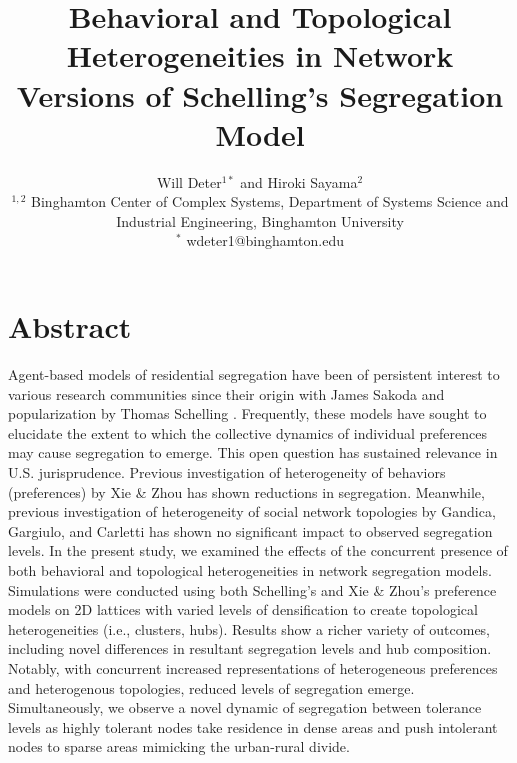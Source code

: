 \documentclass[a4paper]{article}
\date{}
\begin{document}
\title{\bf \large Behavioral and Topological Heterogeneities in Network Versions of Schelling’s Segregation Model}
\author{\normalsize Will Deter$^{1*}$ and Hiroki Sayama$^{2}$\\
\small$^{1,2}$ Binghamton Center of Complex Systems, Department of Systems Science and Industrial Engineering, Binghamton University\\
\small$^*$ wdeter1@binghamton.edu}




\maketitle

\section{Abstract}

Agent-based models of residential segregation have been of persistent interest to various research communities since their origin with James Sakoda \cite{SakodaJamesM.1971Tcmo} and popularization by Thomas Schelling \cite{schelling1971dynamic}. Frequently, these models have sought to elucidate the extent to which the collective dynamics of individual preferences may cause segregation to emerge. This open question has sustained relevance in U.S. jurisprudence. Previous investigation of heterogeneity of behaviors (preferences) by Xie \& Zhou \cite{xie2012modeling} has shown reductions in segregation. Meanwhile, previous investigation of heterogeneity of social network topologies by Gandica, Gargiulo, and Carletti \cite{gandica2016can} has shown no significant impact to observed segregation levels.  In the present study, we examined the effects of the concurrent presence of both behavioral and topological heterogeneities in network segregation models. Simulations were conducted using both Schelling’s and Xie \& Zhou's preference models on 2D lattices with varied levels of densification to create topological heterogeneities (i.e., clusters, hubs). Results show a richer variety of outcomes, including novel differences in resultant segregation levels and hub composition. Notably, with concurrent increased representations of heterogeneous preferences and heterogenous topologies, reduced levels of segregation emerge. Simultaneously, we observe a novel dynamic of segregation between tolerance levels as highly tolerant nodes take residence in dense areas and push intolerant nodes to sparse areas mimicking the urban-rural divide.
\end{document}
